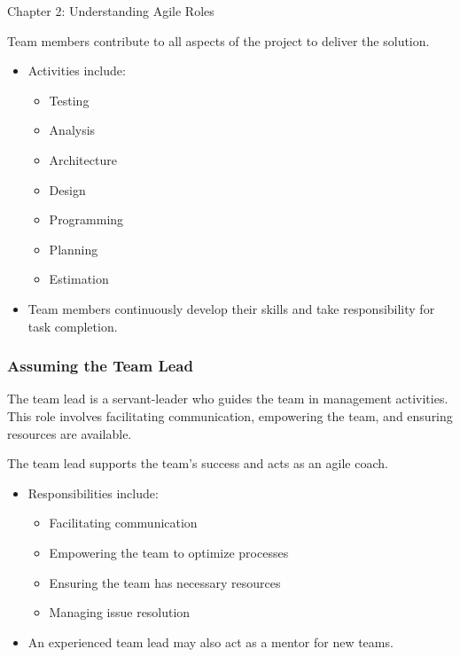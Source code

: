 \begin{notes}{Chapter 2: Understanding Agile Roles}
\begin{highlight}
        Team members contribute to all aspects of the project to deliver the solution.
        
        \begin{itemize}
            \item Activities include:
            \begin{itemize}
                \item Testing
                \item Analysis
                \item Architecture
                \item Design
                \item Programming
                \item Planning
                \item Estimation
            \end{itemize}
            \item Team members continuously develop their skills and take responsibility for task completion.
        \end{itemize}
    
    \end{highlight}
    
    \subsubsection*{Assuming the Team Lead}
    
    The team lead is a servant-leader who guides the team in management activities. This role involves facilitating communication, empowering the team, and ensuring resources are available.
    
    \begin{highlight}
    
        The team lead supports the team's success and acts as an agile coach.
        
        \begin{itemize}
            \item Responsibilities include:
            \begin{itemize}
                \item Facilitating communication
                \item Empowering the team to optimize processes
                \item Ensuring the team has necessary resources
                \item Managing issue resolution
            \end{itemize}
            \item An experienced team lead may also act as a mentor for new teams.
        \end{itemize}
    

\end{highlight}
\end{notes}
